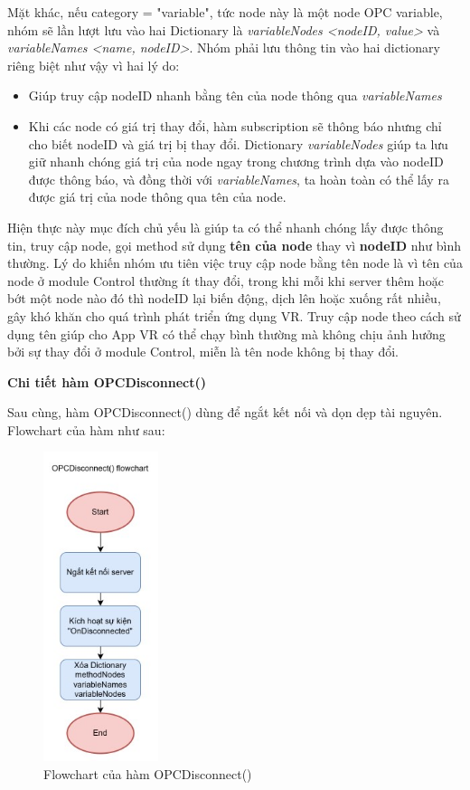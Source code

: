 Mặt khác, nếu category = "variable", tức node này là một node OPC variable, nhóm sẽ lần lượt lưu vào hai Dictionary là \textit{variableNodes <nodeID, value>} và \textit{variableNames <name, nodeID>}. Nhóm phải lưu thông tin vào hai dictionary riêng biệt như vậy vì hai lý do: 
\begin{itemize}
    \item Giúp truy cập nodeID nhanh bằng tên của node thông qua \textit{variableNames}
    \item Khi các node có giá trị thay đổi, hàm subscription sẽ thông báo nhưng chỉ cho biết nodeID và giá trị bị thay đổi. Dictionary \textit{variableNodes} giúp ta lưu giữ nhanh chóng giá trị của node ngay trong chương trình dựa vào nodeID được thông báo, và đồng thời với \textit{variableNames}, ta hoàn toàn có thể lấy ra được giá trị của node thông qua tên của node.
\end{itemize}

Hiện thực này mục đích chủ yếu là giúp ta có thể nhanh chóng lấy được thông tin, truy cập node, gọi method sử dụng \textbf{tên của node} thay vì \textbf{nodeID} như bình thường. Lý do khiến nhóm ưu tiên việc truy cập node bằng tên node là vì tên của node ở module Control thường ít thay đổi, trong khi mỗi khi server thêm hoặc bớt một node nào đó thì nodeID lại biến động, dịch lên hoặc xuống rất nhiều, gây khó khăn cho quá trình phát triển ứng dụng VR. Truy cập node theo cách sử dụng tên giúp cho App VR có thể chạy bình thường mà không chịu ảnh hưởng bởi sự thay đổi ở module Control, miễn là tên node không bị thay đổi.

\textbf{Chi tiết hàm OPCDisconnect()}

Sau cùng, hàm OPCDisconnect() dùng để ngắt kết nối và dọn dẹp tài nguyên. Flowchart của hàm như sau:

\begin{figure}[H]
    \centering
    \includegraphics[width=0.3\textwidth]{Images/Implementation/VRapp/VR_disconnect_func.jpg}
    \caption{Flowchart của hàm OPCDisconnect()}
    \label{fig:flow_OPCDis}
\end{figure}

